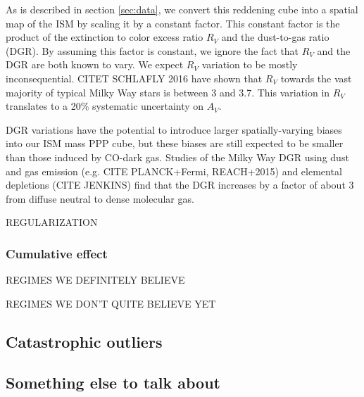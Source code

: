 As is described in section \ref{sec:data}, we convert this reddening cube into a spatial map of the ISM by scaling it by a constant factor. This constant factor is the product of the extinction to color excess ratio $R_V$ and the dust-to-gas ratio (DGR). By assuming this factor is constant, we ignore the fact that $R_V$ and the DGR are both known to vary. We expect $R_V$ variation to be mostly inconsequential. CITET SCHLAFLY 2016 have shown that $R_V$ towards the vast majority of typical Milky Way stars is between 3 and 3.7. This variation in $R_V$ translates to a 20\% systematic uncertainty on $A_V$.

DGR variations have the potential to introduce larger spatially-varying biases into our ISM mass PPP cube, but these biases are still expected to be smaller than those induced by CO-dark gas. Studies of the Milky Way DGR using dust and gas emission (e.g. CITE PLANCK+Fermi, REACH+2015) and elemental depletions (CITE JENKINS) find that the DGR increases by a factor of about 3 from diffuse neutral to dense molecular gas. 

REGULARIZATION

\subsubsection{Cumulative effect}
REGIMES WE DEFINITELY BELIEVE

REGIMES WE DON'T QUITE BELIEVE YET

\subsection{Catastrophic outliers}
\label{sec:discussion-catastrophic}

\subsection{Something else to talk about}